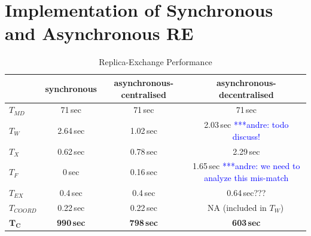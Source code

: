 \documentclass{rspublic}
\newcommand{\jhanote}[1]{ {\textcolor{red} { ***shantenu: #1 }}}
\newcommand{\alnote}[1]{ {\textcolor{blue} { ***andre: #1 }}}
\newcommand{\athotanote}[1]{ {\textcolor{green} { ***athota: #1 }}}
\newcommand{\alnote}[1]{}
\newcommand{\athotanote}[1]{}
\newcommand{\jhanote}[1]{}
\begin{document}
  

\section{Implementation of Synchronous and Asynchronous RE}
\label{sec:re_impl}





\begin{table}
    \centering
	\begin{tabular}{|l|c|c|c|}
	\hline
	                        &synchronous  &asynchronous-centralised &asynchronous-decentralised\\
	\hline
	$T_{MD}$       &71\,sec &71\,sec &71\,sec\\
	\hline
	\hline
	$T_{W}$        &2.64\,sec &1.02\,sec &2.03\,sec\alnote{todo discuss!}\\
	\hline
	\hline
	$T_{X}$        &0.62\,sec &0.78\,sec &2.29\,sec\\
	\hline
	\hspace{2mm}$T_{F}$        &0\,sec   &0.16\,sec &1.65\,sec \alnote{we need to analyze this mis-match}\\
	\hline
	\hspace{2mm}$T_{EX}$       &0.4\,sec &0.4\,sec &0.64\,sec???\\
	\hline
    \hspace{2mm}$T_{COORD}$    &0.22\,sec &0.22\,sec    &NA (included in $T_W$)\,\\
	\hline
	\hline
	$\mathbf{T_{C}}$        &\textbf{990\,sec} &\textbf{798\,sec}    &\textbf{603\,sec}\\
	\hline
    \end{tabular}
	\caption{Replica-Exchange Performance}
	\label{table:repex_perf}
\end{table}
\end{document}

